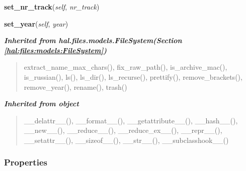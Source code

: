    \vspace{0.5ex}

\hspace{.8\funcindent}\begin{boxedminipage}{\funcwidth}

    \raggedright \textbf{set\_nr\_track}(\textit{self}, \textit{nr\_track})

\setlength{\parskip}{2ex}
\setlength{\parskip}{1ex}
    \end{boxedminipage}

    \label{hal:files:models:MP3Song:set_year}

    \vspace{0.5ex}

\hspace{.8\funcindent}\begin{boxedminipage}{\funcwidth}

    \raggedright \textbf{set\_year}(\textit{self}, \textit{year})

\setlength{\parskip}{2ex}
\setlength{\parskip}{1ex}
    \end{boxedminipage}


\large{\textbf{\textit{Inherited from hal.files.models.FileSystem\textit{(Section \ref{hal:files:models:FileSystem})}}}}

\begin{quote}
extract\_name\_max\_chars(), fix\_raw\_path(), is\_archive\_mac(), is\_russian(), ls(), ls\_dir(), ls\_recurse(), prettify(), remove\_brackets(), remove\_year(), rename(), trash()
\end{quote}

\large{\textbf{\textit{Inherited from object}}}

\begin{quote}
\_\_delattr\_\_(), \_\_format\_\_(), \_\_getattribute\_\_(), \_\_hash\_\_(), \_\_new\_\_(), \_\_reduce\_\_(), \_\_reduce\_ex\_\_(), \_\_repr\_\_(), \_\_setattr\_\_(), \_\_sizeof\_\_(), \_\_str\_\_(), \_\_subclasshook\_\_()
\end{quote}


  \subsubsection{Properties}

